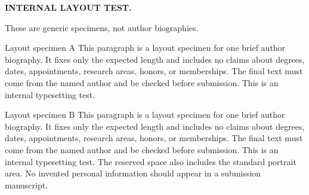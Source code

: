 \documentclass[journal]{IEEEtran}
\begin{document}
{\raggedright\noindent\textbf{INTERNAL LAYOUT TEST.}\par
These are generic specimens, not author biographies.\par}
\noindent\begin{minipage}{\columnwidth}
\begin{IEEEbiographynophoto}{Layout specimen A}
This paragraph is a layout specimen for one brief author biography. It fixes only the expected length and includes no claims about degrees, dates, appointments, research areas, honors, or memberships. The final text must come from the named author and be checked before submission. This is an internal typesetting test.
\end{IEEEbiographynophoto}
\begin{IEEEbiographynophoto}{Layout specimen B}
This paragraph is a layout specimen for one brief author biography. It fixes only the expected length and includes no claims about degrees, dates, appointments, research areas, honors, or memberships. The final text must come from the named author and be checked before submission. This is an internal typesetting test. The reserved space also includes the standard portrait area. No invented personal information should appear in a submission manuscript.
\end{IEEEbiographynophoto}
\end{minipage}
\end{document}
